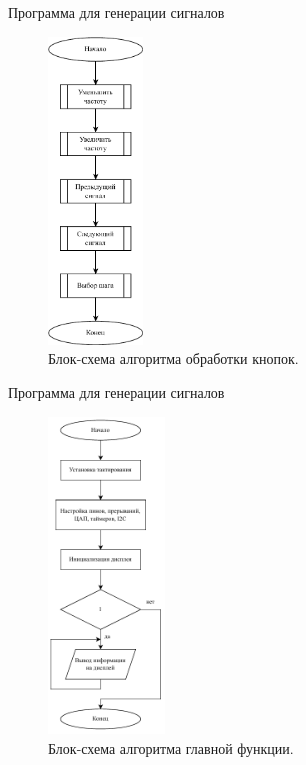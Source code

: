 \documentclass[10pt]{beamer}
\begin{document}
\begin{frame}{Программа для генерации сигналов}
  \begin{figure}
  \includegraphics[width=0.225\textwidth]{buttons}
  \caption{Блок-схема алгоритма обработки кнопок.}
  \end{figure}
\end{frame}

\begin{frame}{Программа для генерации сигналов}
  \begin{figure}
  \includegraphics[width=0.275\textwidth]{main}
  \caption{Блок-схема алгоритма главной функции.}
  \end{figure}
\end{frame}
\end{document}
